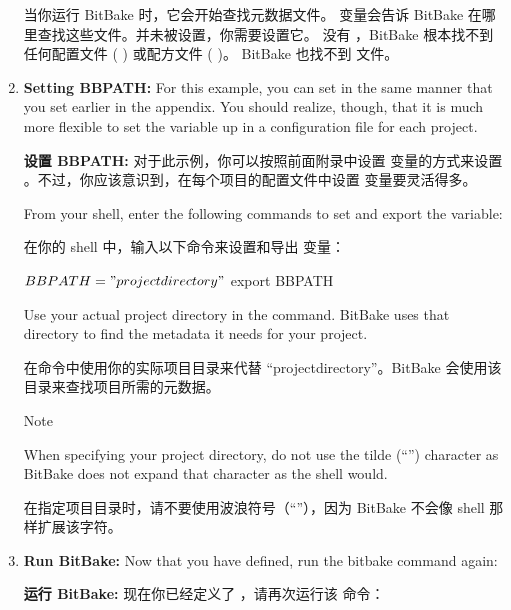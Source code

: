 \begin{enumerate}
\medskip
当你运行 BitBake 时，它​​会开始查找元数据文件。  变量会告诉 BitBake 在哪里查找这些文件。并未被设置，你需要设置它。 没有 ，BitBake 根本找不到任何配置文件 ( ) 或配方文件 ( )。 BitBake 也找不到  文件。

\item \textbf{Setting BBPATH:} For this example, you can set  in the same manner that you set  earlier in the appendix. You should realize, though, that it is much more flexible to set the  variable up in a configuration file for each project.

\medskip
\textbf{设置 BBPATH:} 对于此示例，你可以按照前面附录中设置  变量的方式来设置 。不过，你应该意识到，在每个项目的配置文件中设置  变量要灵活得多。

\medskip
From your shell, enter the following commands to set and export the  variable:

\medskip
在你的 shell 中，输入以下命令来设置和导出  变量：

\begin{pyglist}
$ BBPATH="projectdirectory"
$ export BBPATH
\end{pyglist}

\medskip
Use your actual project directory in the command. BitBake uses that directory to find the metadata it needs for your project.

\medskip
在命令中使用你的实际项目目录来代替 ``projectdirectory''。BitBake 会使用该目录来查找项目所需的元数据。
\begin{noteblock}{Note}%

\medskip      
When specifying your project directory, do not use the tilde (“\code{~}”) character as BitBake does not expand that character as the shell would.

\medskip
在指定项目目录时，请不要使用波浪符号（“\code{~}”），因为 BitBake 不会像 shell 那样扩展该字符。
\end{noteblock}

\item \textbf{Run BitBake:} Now that you have  defined, run the bitbake command again:

\medskip
\textbf{运行 BitBake:} 现在你已经定义了 ，请再次运行该  命令：

\medskip
{}


\end{enumerate}
